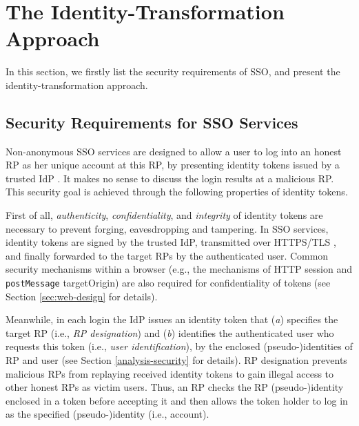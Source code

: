 \section{The Identity-Transformation Approach}
\label{sec:challenge}

In this section,
    we firstly list the security requirements of SSO,
        and present the identity-transformation approach.

\subsection{Security Requirements for SSO Services}
\label{subsec:basicrequirements}

Non-anonymous SSO services are designed to allow a user to log into an honest RP as her unique account at this RP, %
by presenting identity tokens issued by a trusted IdP   \cite{OpenIDConnect,rfc6749,SAML,SAMLIdentifier,NIST2017draft}.
It makes no sense to discuss the login results at a malicious RP. 
This security goal is achieved through the following properties of identity tokens.

First of all, \emph{authenticity}, \emph{confidentiality}, and \emph{integrity} of identity tokens are necessary to prevent forging, eavesdropping and tampering.
In SSO services, identity tokens are signed by the trusted IdP,
    transmitted over HTTPS/TLS \cite{OpenIDConnect, rfc6749, SAML},
    and finally forwarded to the target RPs by the authenticated user.
Common security mechanisms within a browser (e.g., the mechanisms of HTTP session and \verb+postMessage+ targetOrigin)
are also required for confidentiality of tokens \cite{GoogleIdIntegrate,de2014oauth,FettKS14,BrowserID} (see Section \ref{sec:web-design} for details).

Meanwhile, in each login the IdP issues an identity token that (\emph{a}) specifies the target RP (i.e., \emph{RP designation}) and (\emph{b}) identifies the authenticated user who requests this token (i.e., \emph{user identification}),
        by the enclosed (pseudo-)identities of RP and user \cite{OpenIDConnect,rfc6749,SAML} (see Section \ref{analysis-security} for details).
RP designation prevents malicious RPs from replaying received identity tokens to gain illegal access to other honest RPs as victim users.
Thus, an RP checks the RP (pseudo-)identity enclosed in a token before accepting it 
\cite{OpenIDConnect,BrowserID,SPRESSO,NIST2017draft,POIDC,save-flow,up-sso,miso}
 and then allows the token holder to log in as the specified (pseudo-)identity (i.e., account).

